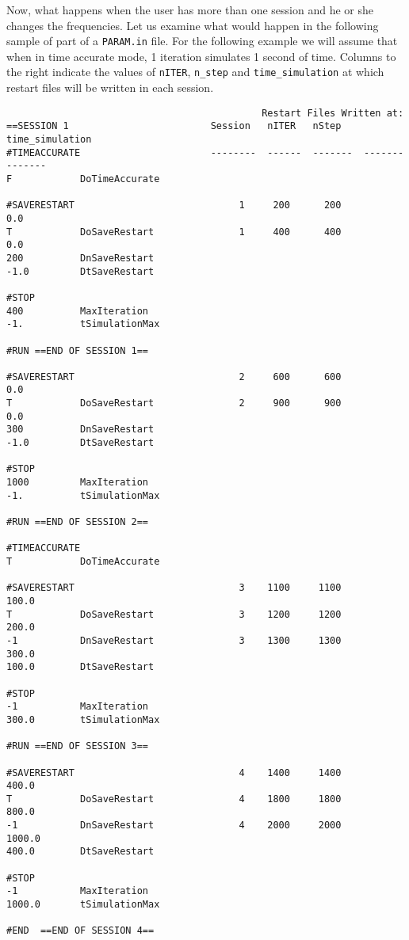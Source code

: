 Now, what happens when the user has more than one session and he or she
changes the frequencies.  Let us examine what would happen in the following
sample of part of a {\tt PARAM.in} file.  For the following example we will
assume that when in time accurate mode, 1 iteration simulates 1 second of time.
Columns to the right indicate the values of {\tt nITER}, {\tt n\_step} and
{\tt time\_simulation} at which restart files will be written in each session.

\clearpage

\begin{verbatim}
                                             Restart Files Written at:
==SESSION 1                         Session   nITER   nStep    time_simulation
#TIMEACCURATE                       --------  ------  -------  --------------
F            DoTimeAccurate  

#SAVERESTART                             1     200      200             0.0  
T            DoSaveRestart               1     400      400             0.0
200          DnSaveRestart
-1.0         DtSaveRestart

#STOP
400          MaxIteration
-1.          tSimulationMax

#RUN ==END OF SESSION 1== 
                         
#SAVERESTART                             2     600      600             0.0
T            DoSaveRestart               2     900      900             0.0
300          DnSaveRestart
-1.0         DtSaveRestart
				
#STOP				
1000         MaxIteration				
-1.          tSimulationMax
				
#RUN ==END OF SESSION 2== 

#TIMEACCURATE
T            DoTimeAccurate  		
				
#SAVERESTART                             3    1100     1100           100.0
T            DoSaveRestart               3    1200     1200           200.0
-1           DnSaveRestart               3    1300     1300           300.0
100.0        DtSaveRestart
				
#STOP				
-1           MaxIteration				
300.0        tSimulationMax			
				
#RUN ==END OF SESSION 3== 
                          
#SAVERESTART                             4    1400     1400           400.0
T            DoSaveRestart               4    1800     1800           800.0
-1           DnSaveRestart               4    2000     2000          1000.0
400.0        DtSaveRestart
 				
#STOP				
-1           MaxIteration				
1000.0       tSimulationMax				
				
#END  ==END OF SESSION 4== 
\end{verbatim}
